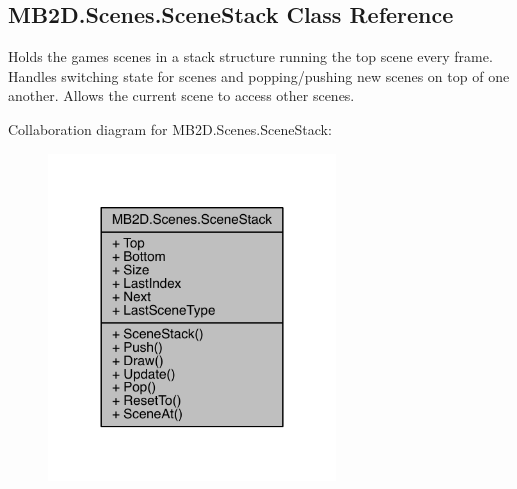 \hypertarget{class_m_b2_d_1_1_scenes_1_1_scene_stack}{}\subsection{M\+B2\+D.\+Scenes.\+Scene\+Stack Class Reference}
\label{class_m_b2_d_1_1_scenes_1_1_scene_stack}


Holds the games scenes in a stack structure running the top scene every frame. Handles switching state for scenes and popping/pushing new scenes on top of one another. Allows the current scene to access other scenes.  




Collaboration diagram for M\+B2\+D.\+Scenes.\+Scene\+Stack\+:
\nopagebreak
\begin{figure}[H]
\begin{center}
\leavevmode
\includegraphics[width=216pt]{class_m_b2_d_1_1_scenes_1_1_scene_stack__coll__graph}
\end{center}
\end{figure}
